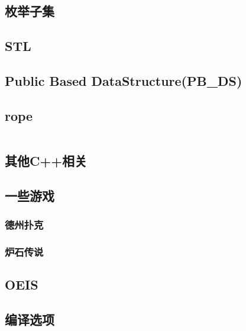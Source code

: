 \documentclass[a4paper, twoside]{article}
\begin{document}
\begin{multicols}{2}
			\subsection{枚举子集}
				
				
			\subsection{STL}
				

			\subsection{Public Based DataStructure(PB\_DS)}
				\label{pbds}
				

			\subsection{rope}
				\inputminted{cpp}{../src/misc/rope.cpp}
			
			\subsection{其他C++相关}
				
			
			\subsection{一些游戏}
				\subsubsection{德州扑克}
					

				\subsubsection{炉石传说}
					

			\subsection{OEIS}
				\label{oeis}
				
			
			\subsection{编译选项}
				
				

\end{multicols}
\end{document}
